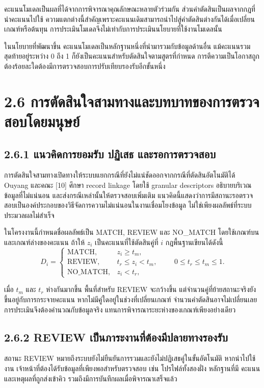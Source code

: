 คะแนนโมเดลเป็นผลที่ได้จากการพิจารณาคุณลักษณะหลายตัวร่วมกัน ส่วนคำตัดสินเป็นผลจากกฎที่นำคะแนนไปใช้ ความแตกต่างนี้สำคัญเพราะคะแนนเดิมสามารถนำไปสู่คำตัดสินต่างกันได้เมื่อเปลี่ยนเกณฑ์หรือต้นทุน การประเมินโมเดลจึงไม่เท่ากับการประเมินนโยบายที่ใช้งานโมเดลนั้น

ในนโยบายที่พัฒนาขึ้น คะแนนโมเดลเป็นหลักฐานหนึ่งที่นำมารวมกับข้อมูลด้านอื่น แม้คะแนนรวมสุดท้ายอยู่ระหว่าง 0 ถึง 1 ก็ยังเป็นคะแนนสำหรับตัดสินใจตามสูตรที่กำหนด การตีความเป็นโอกาสถูกต้องร้อยละใดต้องมีการตรวจสอบการปรับเทียบรองรับอีกขั้นหนึ่ง

\section*{2.6 การตัดสินใจสามทางและบทบาทของการตรวจสอบโดยมนุษย์}
\subsection*{2.6.1 แนวคิดการยอมรับ ปฏิเสธ และรอการตรวจสอบ}
การตัดสินใจสามทางเปิดทางให้ระบบแยกกรณีที่ยังไม่แน่ชัดออกจากกรณีที่ตัดสินอัตโนมัติได้ Ouyang และคณะ [10] ศึกษา record linkage โดยใช้ granular descriptors อธิบายบริเวณข้อมูลที่ไม่แน่นอน และส่งกรณีเหล่านั้นให้ตรวจสอบเพิ่มเติม แนวคิดนี้แสดงว่าการมีสถานะรอตรวจสอบเป็นองค์ประกอบของวิธีจัดการความไม่แน่นอนในงานเชื่อมโยงข้อมูล ไม่ใช่เพียงผลลัพธ์ที่ระบบประมวลผลไม่สำเร็จ

ในโครงงานนี้กำหนดชื่อผลลัพธ์เป็น MATCH, REVIEW และ NO\_MATCH โดยใช้เกณฑ์บนและเกณฑ์ล่างของคะแนน ถ้าให้ $z_i$ เป็นคะแนนที่ใช้ตัดสินคู่ที่ $i$ กฎพื้นฐานเขียนได้ดังนี้
\begin{equation*}
D_i=\begin{cases}
\mathrm{MATCH}, & z_i\geq t_m,\\
\mathrm{REVIEW}, & t_r\leq z_i<t_m,\\
\mathrm{NO\_MATCH}, & z_i<t_r,
\end{cases}\qquad 0\leq t_r\leq t_m\leq1.
\end{equation*}

เมื่อ $t_m$ และ $t_r$ ห่างกันมากขึ้น พื้นที่สำหรับ REVIEW จะกว้างขึ้น แต่จำนวนคู่ที่ย้ายสถานะจริงยังขึ้นอยู่กับการกระจายคะแนน หากไม่มีคู่ใดอยู่ในช่วงที่เปลี่ยนเกณฑ์ จำนวนคำตัดสินอาจไม่เปลี่ยนเลย การประเมินจึงต้องคำนวณกับข้อมูลจริง แทนการพิจารณาระยะห่างของเกณฑ์เพียงอย่างเดียว

\subsection*{2.6.2 REVIEW เป็นภาระงานที่ต้องมีปลายทางรองรับ}
สถานะ REVIEW หมายถึงระบบยังไม่ยืนยันการรวมและยังไม่ปฏิเสธคู่ในขั้นอัตโนมัติ หากนำไปใช้งาน เจ้าหน้าที่ต้องได้รับข้อมูลที่เพียงพอสำหรับตรวจสอบ เช่น โปรไฟล์ทั้งสองฝั่ง หลักฐานที่มี คะแนน และเหตุผลที่ถูกส่งเข้าคิว รวมถึงมีการบันทึกผลเมื่อพิจารณาเสร็จแล้ว

